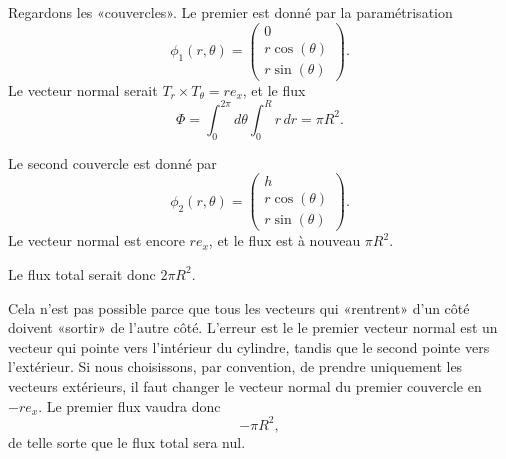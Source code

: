 \begin{example}
    Regardons les «couvercles». Le premier est donné par la paramétrisation
    \begin{equation}
        \phi_1(r,\theta)=\begin{pmatrix}
            0    \\
            r\cos(\theta)    \\
            r\sin(\theta)
        \end{pmatrix}.
    \end{equation}
    Le vecteur normal serait $T_r\times T_{\theta}=re_x$, et le flux
    \begin{equation}
        \Phi=\int_0^{2\pi}d\theta\int_0^Rr\,dr=\pi R^2.
    \end{equation}

    Le second couvercle est donné par
    \begin{equation}
        \phi_2(r,\theta)=\begin{pmatrix}
            h    \\
            r\cos(\theta)    \\
            r\sin(\theta)
        \end{pmatrix}.
    \end{equation}
    Le vecteur normal est encore $re_x$, et le flux est à nouveau $\pi R^2$.

    Le flux total serait donc $2\pi R^2$.

    Cela n'est pas possible parce que tous les vecteurs qui «rentrent» d'un côté doivent «sortir» de l'autre côté. L'erreur est le le premier vecteur normal est un vecteur qui pointe vers l'intérieur du cylindre, tandis que le second pointe vers l'extérieur. Si nous choisissons, par convention, de prendre uniquement les vecteurs extérieurs, il faut changer le vecteur normal du premier couvercle en $-re_x$. Le premier flux vaudra donc
    \begin{equation}
        -\pi R^2,
    \end{equation}
    de telle sorte que le flux total sera nul.
\end{example}
